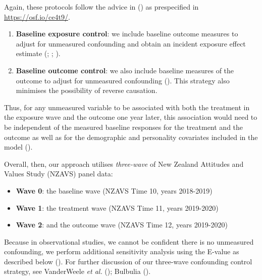 \documentclass[
  singlecolumn]{article}
\begin{document}
Again, these protocols follow the advice in
() as prespecified in
\url{https://osf.io/ce4t9/}.

\begin{enumerate}
\def\labelenumi{\arabic{enumi}.}
\setcounter{enumi}{3}
\item
  \textbf{Baseline exposure control}: we include baseline outcome
  measures to adjust for unmeasured confounding and obtain an incident
  exposure effect estimate (; ;
  ).
\item
  \textbf{Baseline outcome control}: we also include baseline measures
  of the outcome to adjust for unmeasured confounding
  (). This
  strategy also minimises the possibility of reverse causation.
\end{enumerate}

Thus, for any unmeasured variable to be associated with both the
treatment in the exposure wave and the outcome one year later, this
association would need to be independent of the measured baseline
responses for the treatment and the outcome as well as for the
demographic and personality covariates included in the model
().

Overall, then, our approach utilises \emph{three-wave} of New Zealand
Attitudes and Values Study (NZAVS) panel data:

\begin{itemize}
\item
  \textbf{Wave 0}: the baseline wave (NZAVS Time 10, years 2018-2019)
\item
  \textbf{Wave 1}: the treatment wave (NZAVS Time 11, years 2019-2020)
\item
  \textbf{Wave 2}: and the outcome wave (NZAVS Time 12, years 2019-2020)
\end{itemize}

Because in observational studies, we cannot be confident there is no
unmeasured confounding, we perform additional sensitivity analysis using
the E-value as described below
(). For further
discussion of our three-wave confounding control strategy, see
VanderWeele \emph{et al.} ();
Bulbulia ().
\end{document}
